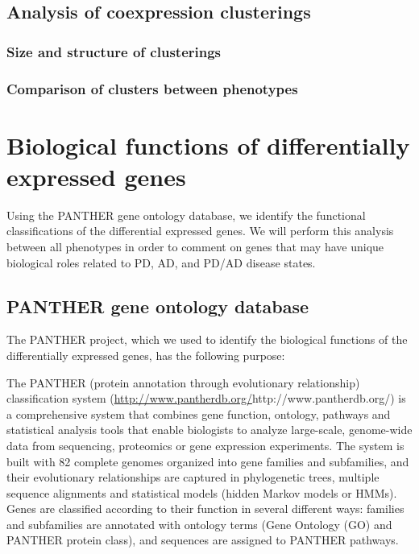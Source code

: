 \subsection{Analysis of coexpression clusterings}
\label{subsec:analys-coexpr-clust}

\subsubsection{Size and structure of clusterings}
\label{subsec:size-struct-clust}

\subsubsection{Comparison of clusters between phenotypes}
\label{subsec:comp-clust-betw}




\section{Biological functions of differentially expressed genes}
\label{sec:biol-funct-diff}

Using the PANTHER gene ontology database, we identify the functional classifications of the differential expressed genes. We will perform this analysis between all phenotypes in order to comment on genes that may have unique biological roles related to PD, AD, and PD/AD disease states.



\subsection{PANTHER gene ontology database}
\label{subsec:panth-gene-ontol}

The PANTHER project, which we used to identify the biological functions of the differentially expressed genes, has the following purpose\cite{PANTHER}:\\

\begin{blockquote}
  The PANTHER (protein annotation through evolutionary relationship) classification system (\url{http://www.pantherdb.org/}{http://www.pantherdb.org/}) is a comprehensive system that combines gene function, ontology, pathways and statistical analysis tools that enable biologists to analyze large-scale, genome-wide data from sequencing, proteomics or gene expression experiments. The system is built with 82 complete genomes organized into gene families and subfamilies, and their evolutionary relationships are captured in phylogenetic trees, multiple sequence alignments and statistical models (hidden Markov models or HMMs). Genes are classified according to their function in several different ways: families and subfamilies are annotated with ontology terms (Gene Ontology (GO) and PANTHER protein class), and sequences are assigned to PANTHER pathways.
\end{blockquote}

